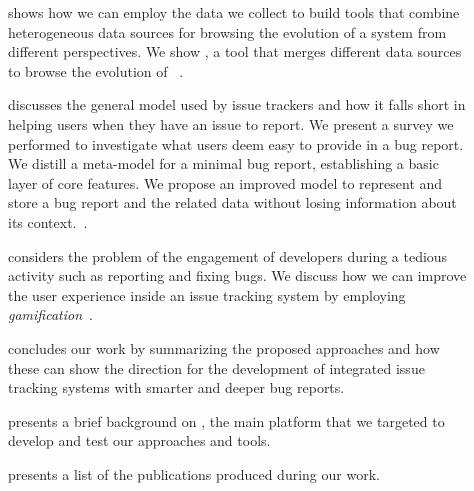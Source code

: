 \begin{description}

  \item[] shows how we can employ the data we collect to build tools that combine heterogeneous data sources for browsing the evolution of a system from different perspectives.
  We show \blend, a tool that merges different data sources to browse the evolution of \pha~\cite{DalS2015b}.



  \item[] discusses the general model used by issue trackers and how it falls short in helping users when they have an issue to report.
  We present a survey we performed to investigate what users deem easy to provide in a bug report.
  We distill a meta-model for a minimal bug report, establishing a basic layer of core features.
  We propose an improved model to represent and store a bug report and the related data without losing information about its context.~\cite{DalS2016a}.



  \item[] considers the problem of the engagement of developers during a tedious activity such as reporting and fixing bugs.
  We discuss how we can improve the user experience inside an issue tracking system by employing \emph{gamification}~\cite{DalS2017a}.


  \item[] concludes our work by summarizing the proposed approaches and how these can show the direction for the development of integrated issue tracking systems with smarter and deeper bug reports.

  \item[] presents a brief background on \pha, the main platform that we targeted to develop and test our approaches and tools.

  \item[] presents a list of the publications produced during our work.
\end{description}
